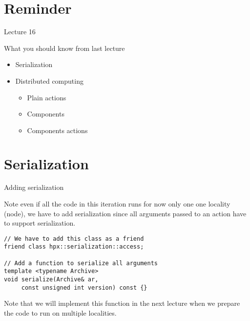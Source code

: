 \documentclass[\classoption]{beamer}
\title{\coursename}
\subtitle{Lecture 17: Distributed implementation of the 1D heat equation}
\author{\tiny Patrick Diehl \orcid{0000-0003-3922-8419}}
\date {
 \tiny \url{\courseurl}
\vspace{2cm}
\doclicenseThis  
  
}
\begin{document}
 {
    \frame {
        \titlepage
    }
}

\frame{

\tableofcontents

}


\section{Reminder}
\begin{frame}{Lecture 16}
\begin{block}{What you should know from last lecture}
\begin{itemize}
\item Serialization
\item Distributed computing
\begin{itemize}
\item Plain actions
\item Components
\item Components actions
\end{itemize}
\end{itemize}
\end{block}
\end{frame}


\section{Serialization}

\begin{frame}[fragile]{Adding serialization}

Note even if all the code in this iteration runs for now only one one locality (node), we have to add serialization since all arguments passed to an action have to support serialization. 
\vspace{0.5cm}
\begin{lstlisting}
// We have to add this class as a friend
friend class hpx::serialization::access;

// Add a function to serialize all arguments
template <typename Archive>
void serialize(Archive& ar, 
     const unsigned int version) const {}
\end{lstlisting}

Note that we will implement this function in the next lecture when we prepare the code to run on multiple localities. 
\end{frame}
\end{document}
